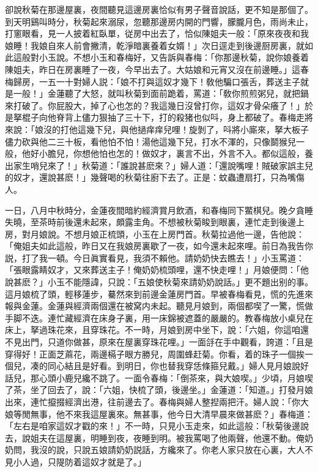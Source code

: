 卻說秋菊在那邊屋裏，夜間聽見這邊房裏恰似有男子聲音說話，更不知是那個了。到天明鷄叫時分，秋菊起來溺尿，忽聽那邊房内開的門響，朦朧月色，雨尚未止，打窻眼看，見一人披着紅臥單，従房中出去了，恰似陳姐夫一般：「原來夜夜和我娘睡！我娘自來人前會撇清，乾淨暗裏養着女婿！」次日逕走到後邊厨房裏，就如此這般對小玉說。不想小玉和春梅好，又告訴與春梅：「你那邊秋菊，說你娘養着陳姐夫，昨日在房裏睡了一夜，今早出去了。大姑娘和元宵又沒在前邊睡。」這春梅歸房，一五一十對婦人説：「娘不打與這奴才幾下！敎他騙口張舌，葬送主子就是一般！」金蓮聽了大怒，就叫秋菊到面前跪着，罵道：「敎你煎煎粥兒，就把鍋來打破了。你屁股大，掉了心也怎的？我這幾日沒曾打你，這奴才骨朵癢了！」於是拏棍子向他脊背上儘力狠抽了三十下，打的殺猪也似呌，身上都破了。春梅走將來說：「娘沒的打他這幾下兒，與他撾痒痒兒哩！旋剝了，呌將小廝來，拏大板子儘力砍與他二三十板，看他怕不怕！湯他這幾下兒，打水不渾的，只像鬬猴兒一般，他好小膽兒，你想他怕也怎的！做奴才，裏言不出，外言不入。都似這般，養出家生哨兒來了！」秋菊道：「誰說甚麽來？」婦人道：「還說嘴哩！賊破家誤主兒的奴才，還說甚麽！」幾聲喝的秋菊往廚下去了。正是：蚊蟲遭扇打，只為嘴傷人。

一日，八月中秋時分，金蓮夜間暗約經濟賞月飲酒，和春梅同下鱉棋兒。晚夕貪睡失曉，至茶時前後還未起來，頗露圭角。不想被秋菊睃到眼裏，連忙走到後邊上房，對月娘說。不想月娘正梳頭，小玉在上房門首。秋菊拉過他一邊，告他說：「俺姐夫如此這般，昨日又在我娘房裏歇了一夜，如今還未起來哩。前日為我告你説，打了我一頓。今日眞實看見，我須不賴他。請奶奶快去瞧去！」小玉罵道：「張眼露睛奴才，又來葬送主子！俺奶奶梳頭哩，還不快走哩！」月娘便問：「他說甚麽？」小玉不能隱諱，只說：「五娘使秋菊來請奶奶說話。」更不題出别的事。這月娘梳了頭，輕移蓮步，驀然來到前邊金蓮房門首。早被春梅看見，慌的先進來報與金蓮。金蓮與經濟兩個還在被窝内未起。聽見月娘到，兩個都喫了一驚，慌做手脚不迭。連忙藏經濟在床身子裏，用一床錦被遮蓋的嚴嚴的。教春梅放小桌兒在床上，拏過珠花來，且穿珠花。不一時，月娘到房中坐下，說：「六姐，你這咱還不見出門，只道你做甚，原來在屋裏穿珠花哩。」一面㧱在手中觀看，誇道：「且是穿得好！正面芝蔴花，兩邊槅子眼方勝兒，周圍蜂赶菊。你看，着的珠子一個挨一個兒，凑的同心結且是好看。到明日，你也替我穿恁條箍兒戴。」婦人見月娘說好話兒，那心頭小鹿兒纔不跳了。一面令春梅：「倒茶來，與大娘喫。」少頃，月娘喫了茶，坐了回去了，說：「六姐，快梳了頭，後邊坐。」金蓮道：「知道。」打發月娘出來，連忙攛掇經濟出港，往前邊去了。春梅與婦人整揑兩把汗。婦人說：「你大娘等閒無事，他不來我這屋裏來。無甚事，他今日大清早晨來做甚麽？」春梅道：「左右是咱家這奴才戳的來！」不一時，只見小玉走來，如此這般：「秋菊後邊說去，說姐夫在這屋裏，明睡到夜，夜睡到明。被我罵喝了他兩聲，他還不動。俺奶奶問，我沒的說，只說五娘請奶奶説話，方纔來了。你老人家只放在心裏，大人不見小人過，只隄防着這奴才就是了。」

